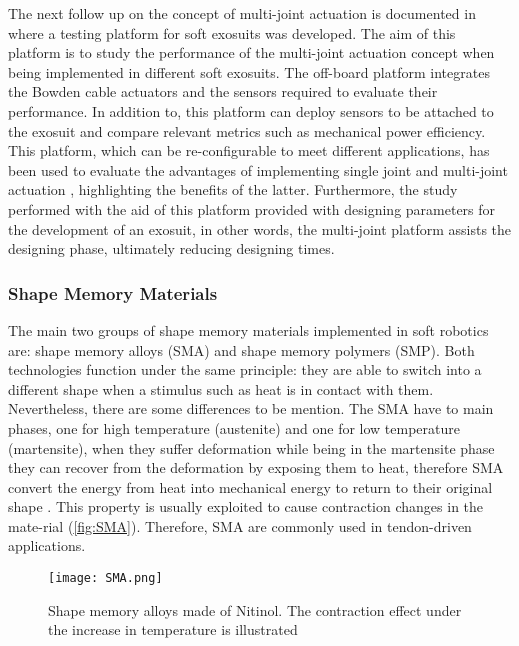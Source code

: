 The next follow up on the concept of multi-joint actuation is documented in \cite{Ding2014} where a testing platform for soft exosuits was developed. The aim of this platform is to study the performance of the multi-joint actuation concept when being implemented in different soft exosuits. The off-board platform integrates the Bowden cable actuators and the sensors required to evaluate their performance. In addition to, this platform can deploy sensors to be attached to the exosuit and compare relevant metrics such as mechanical power efficiency. This platform, which can be re-configurable to meet different applications, has been used to evaluate the advantages of implementing single joint and multi-joint actuation \cite{Ding2016}, highlighting the benefits of the latter. Furthermore, the study performed with the aid of this platform provided with designing parameters for the development of an exosuit, in other words, the multi-joint platform assists the designing phase, ultimately reducing designing times.

\subsubsection{Shape Memory Materials}

The main two groups of shape memory materials implemented in soft robotics are: shape memory alloys (SMA) and shape memory polymers (SMP). Both technologies function under the same principle: they are able to switch into a different shape when a stimulus such as heat is in contact with them. Nevertheless, there are some differences to be mention. The SMA have to main phases, one for high temperature (austenite) and one for low temperature (martensite), when they suffer deformation while being in the martensite phase they can recover from the deformation by exposing them to heat, therefore SMA convert the energy from heat into mechanical energy to return to their original shape \cite{ImagesScientificInstrument2016}. This property is usually exploited to cause contraction changes in the mate-rial (\autoref{fig:SMA}). Therefore, SMA are commonly used in tendon-driven applications.
\begin{figure}[hbtp!]
    \centering
    \texttt{[image: SMA.png]}
    \caption{Shape memory alloys made of Nitinol. The contraction effect under the increase in temperature is illustrated \cite{ImagesScientificInstrument2016} }
    \label{fig:SMA}
\end{figure}

